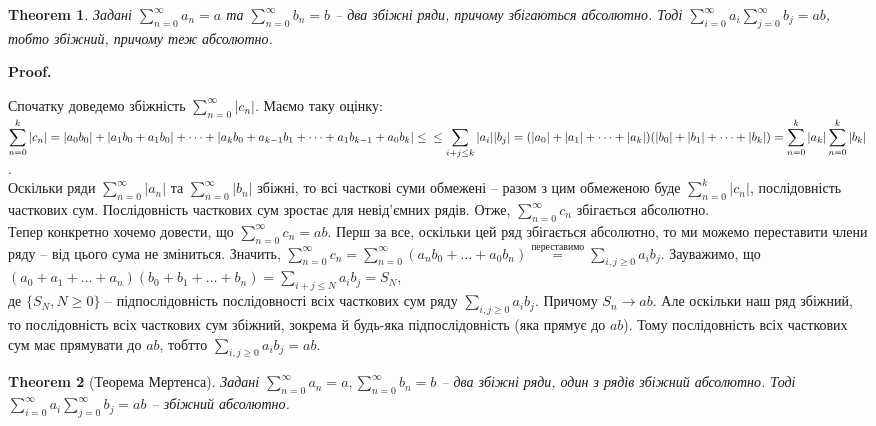 \documentclass[a4paper, 10pt]{article}
\makeatletter
\theoremstyle{theoremdd}
\newtheorem{theorem}{Theorem}[subsection]
\theoremstyle{theoremdd}
\theoremstyle{theoremdd}
\theoremstyle{theoremdd}
\theoremstyle{theoremdd}
\theoremstyle{theoremdd}
\theoremstyle{theoremdd}
\theoremstyle{theoremdd}
\theoremstyle{theoremdd}
\renewenvironment{proof}[1][Proof.\\]{\par
\pushQED{\hfill \qed}%
\normalfont \topsep6\p@\@plus6\p@\relax
\trivlist
\item\relax
{\bfseries
#1\@addpunct{.}}\hspace\labelsep\ignorespaces
}{%
\popQED\endtrivlist\@endpefalse
}
\makeatother
\begin{document}
\begin{theorem}
Задані $\displaystyle\sum_{n=0}^\infty a_n = a$ та $\displaystyle\sum_{n=0}^\infty b_n = b$ -- два збіжні ряди, причому збігаються абсолютно. Тоді $\displaystyle\sum_{i=0}^\infty a_i \sum_{j=0}^\infty b_j = ab$, тобто збіжний, причому теж абсолютно.
\end{theorem}

\begin{proof}
Спочатку доведемо збіжність $\displaystyle\sum_{n=0}^\infty |c_n|$. Маємо таку оцінку:\\
$\displaystyle\sum_{n=0}^k |c_n| = |a_0 b_0| + |a_1 b_0 + a_1 b_0| + \dots + |a_k b_0 + a_{k-1} b_1 + \dots + a_1 b_{k-1} + a_0 b_k| \leq \\
\leq \displaystyle\sum_{i+j \leq k} |a_i| |b_j| = (|a_0| + |a_1| + \dots + |a_k|) (|b_0| + |b_1| + \dots + |b_k|) = \sum_{n=0}^k |a_k| \sum_{n=0}^k |b_k|$.\\
Оскільки ряди $\displaystyle\sum_{n=0}^\infty |a_n|$ та $\displaystyle\sum_{n=0}^\infty |b_n|$ збіжні, то всі часткові суми обмежені -- разом з цим обмеженою буде $\displaystyle\sum_{n=0}^k |c_n|$, послідовність часткових сум. Послідовність часткових сум зростає для невід'ємних рядів. Отже, $\displaystyle\sum_{n=0}^\infty c_n$ збігається абсолютно.\\
Тепер конкретно хочемо довести, що $\displaystyle\sum_{n=0}^\infty c_n = ab$. Перш за все, оскільки цей ряд збігається абсолютно, то ми можемо переставити члени ряду -- від цього сума не зміниться. Значить, $\displaystyle\sum_{n=0}^\infty c_n = \sum_{n=0}^\infty (a_n b_0 + \dots + a_0 b_n) \overset{\text{переставимо}}{=} \sum_{i,j \geq 0} a_i b_j$. Зауважимо, що\\
$(a_0 + a_1 + \dots + a_n)(b_0 + b_1 + \dots + b_n) = \displaystyle\sum_{i+j \leq N} a_i b_j = S_N$,\\
де $\{S_N, N \geq 0\}$ -- підпослідовність послідовності всіх часткових сум ряду $\displaystyle\sum_{i,j \geq 0} a_i b_j$. Причому $S_n \to ab$. Але оскільки наш ряд збіжний, то послідовність всіх часткових сум збіжний, зокрема й будь-яка підпослідовність (яка прямує до $ab$). Тому послідовність всіх часткових сум має прямувати до $ab$, тобтто $\displaystyle\sum_{i,j \geq 0} a_ib_j = ab$.
\end{proof}

\begin{theorem}[Теорема Мертенса]
Задані $\displaystyle\sum_{n=0}^\infty a_n = a, \sum_{n=0}^\infty b_n = b$ -- два збіжні ряди, один з рядів збіжний абсолютно. Тоді $\displaystyle\sum_{i=0}^\infty a_i \sum_{j=0}^\infty b_j = ab$ -- збіжний абсолютно.
\end{theorem}
\end{document}
